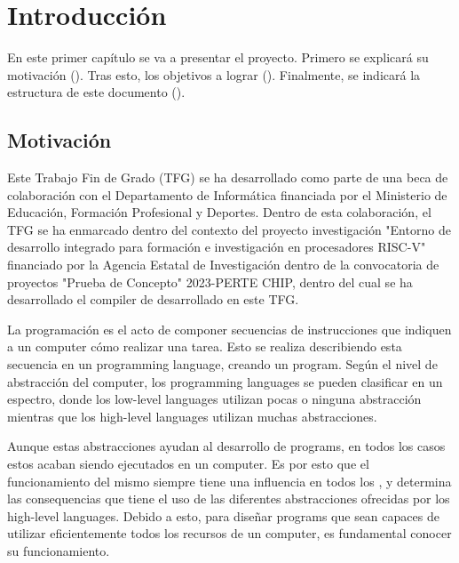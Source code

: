 \chapter{Introducción}\label{chap:introduction}

En este primer capítulo se va a presentar el proyecto. Primero se explicará su
motivación (). Tras esto, los objetivos a
lograr (). Finalmente, se indicará la estructura de este
documento ().

\section{Motivación}\label{sec:motivation}

Este Trabajo Fin de Grado (TFG) se ha desarrollado como parte de una beca de
colaboración con el Departamento de Informática financiada por el Ministerio de
Educación, Formación Profesional y Deportes. Dentro de esta colaboración, el TFG
se ha enmarcado dentro del contexto del proyecto investigación "Entorno de
desarrollo integrado para formación e investigación en procesadores RISC-V"
financiado por la Agencia Estatal de Investigación dentro de la convocatoria de
proyectos "Prueba de Concepto" 2023-PERTE CHIP, dentro del cual se ha
desarrollado el \gls{compiler} de  desarrollado
en este TFG.

La programación es el acto de componer secuencias de instrucciones que indiquen
a un \gls{computer} cómo realizar una tarea. Esto se realiza describiendo esta
secuencia en un \gls{programming language}, creando un \gls{program}. Según el
nivel de abstracción del \gls{computer}, los \glspl{programming language} se
pueden clasificar en un espectro, donde los \glspl{low-level language} utilizan
pocas o ninguna abstracción mientras que los \glspl{high-level language}
utilizan muchas abstracciones.

Aunque estas abstracciones ayudan al desarrollo de \glspl{program}, en todos los
casos estos acaban siendo ejecutados en un \gls{computer}. Es por esto que el
funcionamiento del mismo siempre tiene una influencia en todos los
, y determina las consequencias que
tiene el uso de las diferentes abstracciones ofrecidas por los \glspl{high-level
language}. Debido a esto, para diseñar \glspl{program} que sean capaces de
utilizar eficientemente todos los recursos de un \gls{computer}, es fundamental
conocer su funcionamiento.

